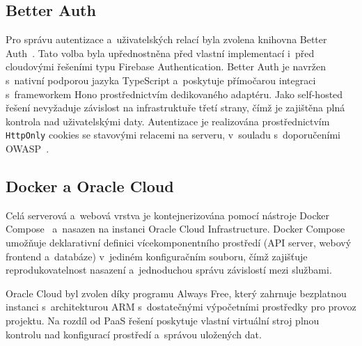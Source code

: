 \subsection{Better Auth}

Pro správu autentizace a~uživatelských relací byla zvolena knihovna Better
Auth~\cite{betterauth2024}. Tato volba byla upřednostněna před vlastní
implementací i~před cloudovými řešeními typu Firebase Authentication. Better
Auth je navržen s~nativní podporou jazyka TypeScript a~poskytuje přímočarou
integraci s~frameworkem Hono prostřednictvím dedikovaného adaptéru.
Jako self-hosted řešení nevyžaduje závislost na infrastruktuře třetí strany,
čímž je zajištěna plná kontrola nad uživatelskými daty. Autentizace je
realizována prostřednictvím \texttt{HttpOnly} cookies se stavovými relacemi
na serveru, v~souladu s~doporučeními OWASP~\cite{owasp2024mobile}.

\subsection{Docker a Oracle Cloud}

Celá serverová a~webová vrstva je kontejnerizována pomocí nástroje Docker
Compose~\cite{docker2024} a~nasazen na instanci Oracle Cloud Infrastructure.
Docker Compose umožňuje deklarativní definici vícekomponentního prostředí
(API server, webový frontend a~databáze) v~jediném konfiguračním souboru,
čímž zajišťuje reprodukovatelnost nasazení a~jednoduchou správu závislostí
mezi službami.

Oracle Cloud byl zvolen díky programu Always Free, který zahrnuje bezplatnou
instanci s~architekturou ARM s~dostatečnými výpočetními prostředky pro provoz
projektu. Na rozdíl od PaaS řešení poskytuje vlastní virtuální stroj plnou
kontrolu nad konfigurací prostředí a~správou uložených dat.
